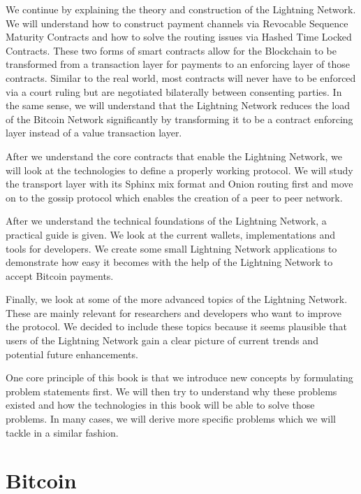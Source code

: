\documentclass[a4paper,12pt,oneside,openany]{book}
\begin{document}
We continue by explaining the theory and construction of the Lightning Network.
We will understand how to construct payment channels via Revocable Sequence Maturity Contracts and how to solve the routing issues via Hashed Time Locked Contracts.
These two forms of smart contracts allow for the Blockchain to be transformed from a transaction layer for payments to an enforcing layer of those contracts.
Similar to the real world, most contracts will never have to be enforced via a court ruling but are negotiated bilaterally between consenting parties.
In the same sense, we will understand that the Lightning Network reduces the load of the Bitcoin Network significantly by transforming it to be a contract enforcing layer instead of a value transaction layer.

After we understand the core contracts that enable the Lightning Network, we will look at the technologies to define a properly working protocol.
We will study the transport layer with its Sphinx mix format and Onion routing first and move on to the gossip protocol which enables the creation of a peer to peer network.

After we understand the technical foundations of the Lightning Network, a practical guide is given.
We look at the current wallets, implementations and tools for developers.
We create some small Lightning Network applications to demonstrate how easy it becomes with the help of the Lightning Network to accept Bitcoin payments.

Finally, we look at some of the more advanced topics of the Lightning Network.
These are mainly relevant for researchers and developers who want to improve the protocol.
We decided to include these topics because it seems plausible that users of the Lightning Network gain a clear picture of current trends and potential future enhancements. 

One core principle of this book is that we introduce new concepts by formulating problem statements first. We will then try to understand why these problems existed and how the technologies in this book will be able to solve those problems. In many cases, we will derive more specific problems which we will tackle in a similar fashion.

\chapter{Bitcoin}
\end{document}
